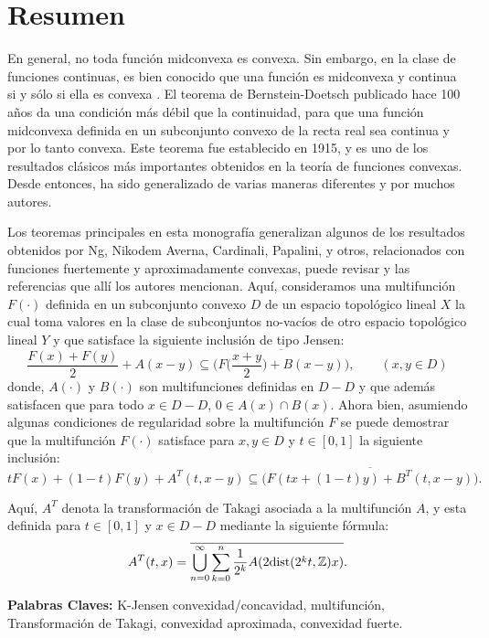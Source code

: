 \chapter*{Resumen}


En general, no toda función midconvexa es convexa. Sin embargo, en la clase de  
funciones continuas, es bien conocido que una función es midconvexa y continua si 
y sólo si ella es convexa \cite{Kuc09}. El teorema de Bernstein-Doetsch publicado hace 100 años da una condición
más débil que la continuidad, para que una función midconvexa definida en un subconjunto
convexo de la recta real sea continua y por lo tanto convexa. 
Este teorema fue establecido en 1915, y es uno de los resultados clásicos más importantes 
obtenidos en la teoría de funciones convexas. Desde entonces, ha sido generalizado de varias 
maneras diferentes y por muchos autores. 

Los teoremas principales en esta monografía generalizan algunos de los resultados obtenidos por Ng, Nikodem
Averna, Cardinali, Papalini, y otros, relacionados con funciones fuertemente y aproximadamente convexas,
puede revisar \cite{MakPal10b,MakPal13b,Nik89} y las referencias que allí los autores mencionan.
Aquí, consideramos una multifunción $F(\cdot)$ definida en un subconjunto convexo $D$ de
un espacio topológico lineal $X$ la cual toma valores en la clase de subconjuntos no-vacíos 
de otro espacio topológico lineal $Y$ y que satisface la siguiente inclusión de tipo Jensen:
$$
\frac{F(x)+F(y)}2 + A(x-y) \subseteq \overline{\bigg(F\bigg(\frac{x+y}2\bigg)+B(x-y)\bigg)},
\qquad
(x,y\in D)
$$
donde, $A(\cdot)$ y $B(\cdot)$ son multifunciones definidas en $D-D$ y que además satisfacen que para todo $x\in D-D$,
$0\in A(x)\cap B(x)$. Ahora bien, asumiendo algunas condiciones de regularidad sobre la multifunción $F$  
se puede demostrar que la multifunción $F(\cdot)$ satisface para $x,y\in D$ y $t\in[0,1]$
la siguiente inclusión:
$$
tF(x)+(1-t)F(y) + A^T(t,x-y) \subseteq \overline{\bigg(F(tx+(1-t)y)+B^T(t,x-y)\bigg)}.
$$

Aquí, $A^T$ denota la transformación de Takagi asociada a la multifunción $A$, 
y esta definida para $t\in[0,1]$ y $x\in D- D$ mediante la siguiente fórmula:
$$
A^T(t,x) = \overline{\bigcup_{n=0}^{\infty}\sum_{k=0}^n{\frac1{2^k}A(2\mbox{dist}(2^kt,\mathbb{Z})x)}}.
$$

{\bf Palabras Claves:} K-Jensen convexidad/concavidad, multifunción, Transformación de Takagi, convexidad aproximada,
convexidad fuerte.